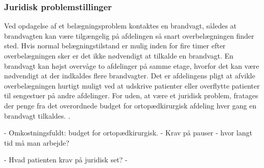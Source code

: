 \subsubsection{Juridisk problemstillinger}
Ved opdagelse af et belægningsproblem kontaktes en brandvagt, således at brandvagten kan være tilgængelig på afdelingen så snart overbelægningen finder sted. Hvis normal belægningstilstand er mulig inden for fire timer efter overbelægningen sker er det ikke nødvendigt at tilkalde en brandvagt. En brandvagt kan højst overvåge to afdelinger på samme etage, hvorfor det kan være nødvendigt at der indkaldes flere brandvagter. Det er afdelingens pligt at  afvikle overbelægningen hurtigt muligt ved at udskrive patienter eller overflytte patienter til sengestuer på andre afdelinger. \cite{Beredskab2016} For uden, at være et juridisk problem, fratages der penge fra det overordnede budget for ortopædkirurgisk afdeling hver gang en brandvagt tilkaldes. \cite{KILDE - er i tvivl om det går ud over den enkelte afdeling eller om det er samlet budget for sygehuset??}.

- Omkostningsfuldt: budget for ortopædkirurgisk.
- Krav på pauser - hvor langt tid må man arbejde?

- Hvad patienten krav på juridisk set?
- 










